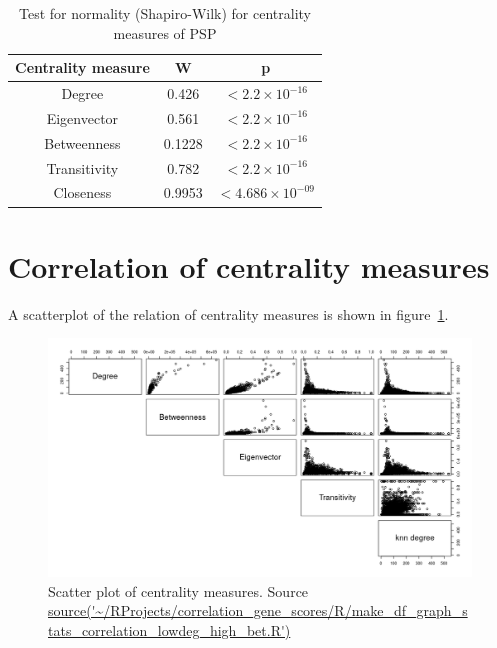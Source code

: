 \begin{table}[h]
    \centering
    \begin{tabular}{c|c|c}
       Centrality measure  &  W& p\\
       \hline
       
       Degree  & 0.426 & $<2.2 \times 10^{-16}$ \\
       Eigenvector &0.561  & $<2.2 \times 10^{-16}$ \\
       Betweenness &0.1228& $<2.2 \times 10^{-16}$ \\
       Transitivity &0.782 & $<2.2 \times 10^{-16}$\\
       Closeness &0.9953& $<4.686 \times 10^{-09}$\\ 
    \end{tabular}
    \caption{Test for normality (Shapiro-Wilk) for centrality measures of PSP}
    \label{Table:Test for normality (Shapiro-Wilk) for centrality measures of PSP}
\end{table}

\section{Correlation of centrality measures}

A scatterplot of the relation of centrality measures is shown in figure~\ref{fig:scatter plot of multiple centrality measures}.

\begin{figure} 
    \centering
    \includegraphics[width=\textwidth]{images/Rplot_pairs_plot.png}
    \caption{Scatter plot of centrality measures. Source \url{source('~/RProjects/correlation_gene_scores/R/make_df_graph_stats_correlation_lowdeg_high_bet.R')}}
    \label{fig:scatter plot of multiple centrality measures}
\end{figure}

